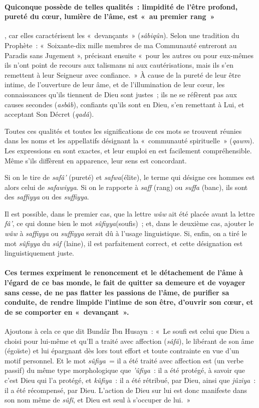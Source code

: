 \paragraph{Quiconque possède de telles qualités~: limpidité de l'être profond,
pureté du cœur, lumière de l'âme, est «~au premier rang~»}, car elles
caractérisent les «~devançants~» (\emph{sâbiqûn}). Selon une tradition
du Prophète~: «~Soixante-dix mille membres de ma Communauté entreront au
Paradis sans Jugement », précisant ensuite «~pour les autres ou pour
eux-mêmes ils n'ont point de recours aux talismans ni aux
cautérisations, mais ils s'en remettent à leur Seigneur avec
confiance.~» À cause de la pureté de leur être intime, de l'ouverture de
leur âme, et de l'illumination de leur cœur, les connaissances qu'ils
tiennent de Dieu sont justes~; ils ne se réfèrent pas aux causes
secondes (\emph{asbâb}), confiants qu'ils sont en Dieu, s'en remettant à
Lui, et acceptant Son Décret (\emph{qadâ}).

Toutes ces qualités et toutes les significations de ces mots se trouvent
réunies dans les noms et les appellatifs désignant la «~communauté
spirituelle~» (\emph{qawm}). Les expressions en sont exactes, et leur
emploi en est facilement compréhensible. Même s'ils diffèrent en
apparence, leur sens est concordant.

\begin{Def}[soufi]
Si on le tire de \emph{safâ'}
(pureté) et \emph{safwa}(élite), le terme qui désigne ces hommes est
alors celui de \emph{safawiyya}. Si on le rapporte à \emph{saff} (rang)
ou \emph{suffa} (banc), ils sont des \emph{saffiyya} ou des
\emph{suffiyya}.
\end{Def}
 Il est possible, dans le premier cas, que la lettre
\emph{wâw} ait été placée avant la lettre \emph{fâ'}, ce qui donne bien
le mot \emph{sûfiyya}(soufis)~; et, dans le deuxième cas, ajouter le
\emph{wâw} à \emph{saffiyya} ou \emph{suffiyya} serait dû à l'usage
linguistique. Si, enfin, on a tiré le mot \emph{sûfiyya} du \emph{sûf}
(laine), il est parfaitement correct, et cette désignation est
linguistiquement juste.

 \paragraph{Ces termes expriment le renoncement et le détachement
de l'âme à l'égard de ce bas monde, le fait de quitter sa demeure et de
voyager sans cesse, de ne pas flatter les passions de l'âme, de purifier
sa conduite, de rendre limpide l'intime de son être, d'ouvrir son cœur,
et de se comporter en «~devançant~». } Ajoutons à cela ce que dit Bundâr
Ibn Husayn~: «~Le soufi est celui que Dieu a choisi pour lui-même et
qu'Il a traité avec affection (\emph{sâfâ}), le libérant de son âme
(égoïste) et lui épargnant dès lors tout effort et toute contrainte en
vue d'un motif personnel. Et le mot \emph{sûfiya~}= il a été traité avec
affection est (un verbe passif) du même type morphologique que
\emph{'ûfiya}~: il a été protégé, à savoir que c'est Dieu qui l'a
protégé, et \emph{kûfiya~}: il a été rétribué, par Dieu, ainsi que
\emph{jûziya~}: il a été récompensé, par Dieu. L'action de Dieu sur lui
est donc manifeste dans son nom même de \emph{sûfî}, et Dieu est seul à
s'occuper de lui.~»

